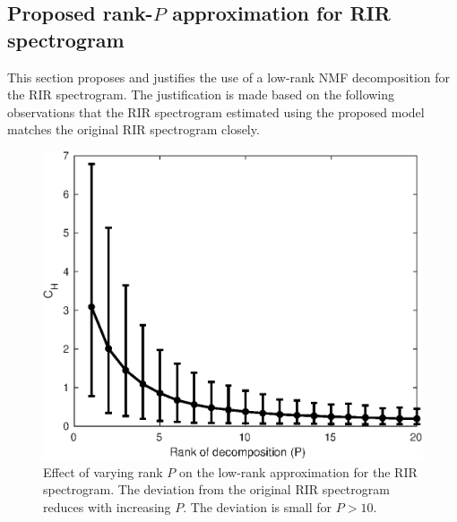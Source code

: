 \subsection{Proposed rank-$P$ approximation for RIR spectrogram}
\label{sec:Rank_p_approx}

This section proposes and justifies the use of a low-rank NMF decomposition for the RIR spectrogram. The justification is made based on the following observations that the RIR spectrogram estimated using the proposed model matches the original RIR spectrogram closely.
\begin{figure}[ht]
\centering
\includegraphics[width=\linewidth]{fig/RIR_NMF_approx_cost_error_plot.eps}
\caption{Effect of varying rank $P$ on the low-rank approximation for the RIR spectrogram. The deviation from the original RIR spectrogram reduces with increasing $P$. The deviation is small for $P>10$.}
\label{fig:rank_p_approximation}
\end{figure}
\iffalse
